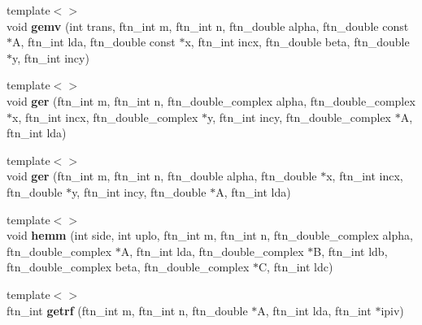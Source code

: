 \begin{DoxyCompactItemize}
\item 
\hypertarget{classsddk_1_1linalg_3_01_c_p_u_01_4_a3a5d71506db433cbacaf169da58e8317}{}{\footnotesize template$<$$>$ }\\void {\bfseries gemv} (int trans, ftn\+\_\+int m, ftn\+\_\+int n, ftn\+\_\+double alpha, ftn\+\_\+double const $\ast$A, ftn\+\_\+int lda, ftn\+\_\+double const $\ast$x, ftn\+\_\+int incx, ftn\+\_\+double beta, ftn\+\_\+double $\ast$y, ftn\+\_\+int incy)\label{classsddk_1_1linalg_3_01_c_p_u_01_4_a3a5d71506db433cbacaf169da58e8317}

\item 
\hypertarget{classsddk_1_1linalg_3_01_c_p_u_01_4_a2dc9128563308ab7e6de1ab187be1fc0}{}{\footnotesize template$<$$>$ }\\void {\bfseries ger} (ftn\+\_\+int m, ftn\+\_\+int n, ftn\+\_\+double\+\_\+complex alpha, ftn\+\_\+double\+\_\+complex $\ast$x, ftn\+\_\+int incx, ftn\+\_\+double\+\_\+complex $\ast$y, ftn\+\_\+int incy, ftn\+\_\+double\+\_\+complex $\ast$A, ftn\+\_\+int lda)\label{classsddk_1_1linalg_3_01_c_p_u_01_4_a2dc9128563308ab7e6de1ab187be1fc0}

\item 
\hypertarget{classsddk_1_1linalg_3_01_c_p_u_01_4_a060b54b30648a70f8a4132b4db7da97c}{}{\footnotesize template$<$$>$ }\\void {\bfseries ger} (ftn\+\_\+int m, ftn\+\_\+int n, ftn\+\_\+double alpha, ftn\+\_\+double $\ast$x, ftn\+\_\+int incx, ftn\+\_\+double $\ast$y, ftn\+\_\+int incy, ftn\+\_\+double $\ast$A, ftn\+\_\+int lda)\label{classsddk_1_1linalg_3_01_c_p_u_01_4_a060b54b30648a70f8a4132b4db7da97c}

\item 
\hypertarget{classsddk_1_1linalg_3_01_c_p_u_01_4_a6f69661f94e77d2adb3a4c0d22892a26}{}{\footnotesize template$<$$>$ }\\void {\bfseries hemm} (int side, int uplo, ftn\+\_\+int m, ftn\+\_\+int n, ftn\+\_\+double\+\_\+complex alpha, ftn\+\_\+double\+\_\+complex $\ast$A, ftn\+\_\+int lda, ftn\+\_\+double\+\_\+complex $\ast$B, ftn\+\_\+int ldb, ftn\+\_\+double\+\_\+complex beta, ftn\+\_\+double\+\_\+complex $\ast$C, ftn\+\_\+int ldc)\label{classsddk_1_1linalg_3_01_c_p_u_01_4_a6f69661f94e77d2adb3a4c0d22892a26}

\item 
\hypertarget{classsddk_1_1linalg_3_01_c_p_u_01_4_a3112d2b57ac4a0cfd859290c17669f2c}{}{\footnotesize template$<$$>$ }\\ftn\+\_\+int {\bfseries getrf} (ftn\+\_\+int m, ftn\+\_\+int n, ftn\+\_\+double $\ast$A, ftn\+\_\+int lda, ftn\+\_\+int $\ast$ipiv)\label{classsddk_1_1linalg_3_01_c_p_u_01_4_a3112d2b57ac4a0cfd859290c17669f2c}


\end{DoxyCompactItemize}

